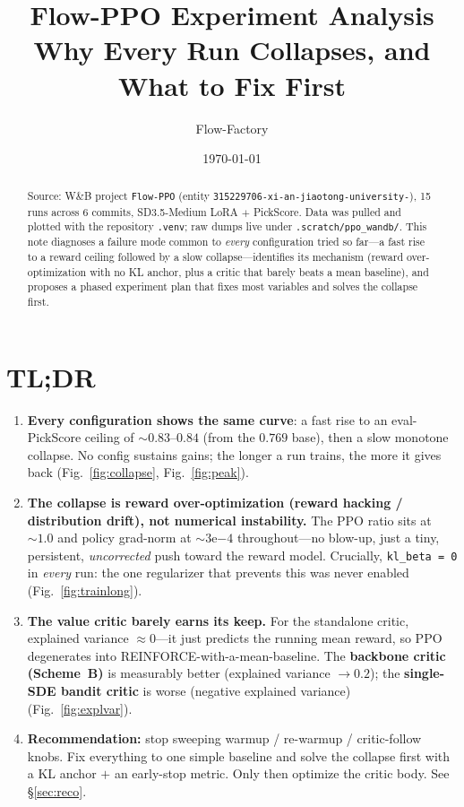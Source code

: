 \documentclass[11pt]{article}
\title{\textbf{Flow-PPO Experiment Analysis}\\[2pt]
\large Why Every Run Collapses, and What to Fix First}
\author{Flow-Factory}
\date{\today}
\newcommand{\code}[1]{\texttt{#1}}
\begin{document}
\maketitle

\begin{abstract}
Source: W\&B project \code{Flow-PPO} (entity
\code{315229706-xi-an-jiaotong-university-}), 15 runs across 6 commits, SD3.5-Medium
LoRA $+$ PickScore. Data was pulled and plotted with the repository \code{.venv}; raw
dumps live under \code{.scratch/ppo\_wandb/}. This note diagnoses a failure mode common
to \emph{every} configuration tried so far---a fast rise to a reward ceiling followed by
a slow collapse---identifies its mechanism (reward over-optimization with no KL anchor,
plus a critic that barely beats a mean baseline), and proposes a phased experiment plan
that fixes most variables and solves the collapse first.
\end{abstract}

\section*{TL;DR}
\begin{enumerate}[leftmargin=1.5em]
  \item \textbf{Every configuration shows the same curve}: a fast rise to an
  eval-PickScore ceiling of ${\sim}0.83$--$0.84$ (from the $0.769$ base), then a slow
  monotone collapse. No config sustains gains; the longer a run trains, the more it gives
  back (Fig.~\ref{fig:collapse}, Fig.~\ref{fig:peak}).
  \item \textbf{The collapse is reward over-optimization (reward hacking / distribution
  drift), not numerical instability.} The PPO ratio sits at ${\sim}1.0$ and policy
  grad-norm at ${\sim}3\mathrm{e}{-4}$ throughout---no blow-up, just a tiny, persistent,
  \emph{uncorrected} push toward the reward model. Crucially, \code{kl\_beta = 0} in
  \emph{every} run: the one regularizer that prevents this was never enabled
  (Fig.~\ref{fig:trainlong}).
  \item \textbf{The value critic barely earns its keep.} For the standalone critic,
  explained variance ${\approx}0$---it just predicts the running mean reward, so PPO
  degenerates into REINFORCE-with-a-mean-baseline. The \textbf{backbone critic
  (Scheme~B)} is measurably better (explained variance ${\to}0.2$); the
  \textbf{single-SDE bandit critic} is worse (negative explained variance)
  (Fig.~\ref{fig:explvar}).
  \item \textbf{Recommendation:} stop sweeping warmup / re-warmup / critic-follow knobs.
  Fix everything to one simple baseline and solve the collapse first with a KL anchor $+$
  an early-stop metric. Only then optimize the critic body. See \S\ref{sec:reco}.
\end{enumerate}
\end{document}
